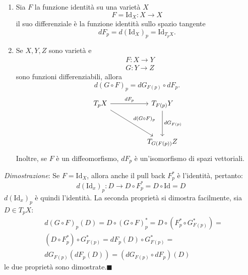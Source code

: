 \documentclass[10pt, letterpaper]{report}
\begin{document}
\begin{proposizione}
    \begin{enumerate}
    \item Sia $F$ la funzione identità su una varietà $X$\begin{equation}
        F=\text{Id}_X:X\rightarrow X
    \end{equation}
    il suo differenziale è la funzione identità sullo spazio tangente\begin{equation}
        dF_p=d(\text{Id}_X)_p=\text{Id}_{T_pX}.
    \end{equation}
    \item Se $X,Y,Z$ sono varietà e \begin{align}
        &F:X\rightarrow Y\\ 
        &G:Y\rightarrow Z
    \end{align}
    sono funzioni differenziabili, allora\begin{equation}
        d(G\circ F)_p=dG_{F(p)}\circ dF_p.
    \end{equation}
\[
\begin{tikzcd}[column sep=huge, row sep=huge]
T_p X \arrow[r, "dF_p"] \arrow[dr, "d(G \circ F)_p"] & T_{F(p)} Y \arrow[d, "dG_{F(p)}"] \\
& T_{G(F(p))} Z
\end{tikzcd}
\]
Inoltre, se $F$ è un diffeomorfismo, $dF_p$ è un'isomorfismo di spazi vettoriali.
\end{enumerate}
\end{proposizione}
\textit{Dimostrazione}:
Se $F=\text{Id}_X$, allora anche il pull back $F_p^*$ è l'identità, pertanto:\begin{equation}
    d(\text{Id}_x)_p:D\rightarrow D\circ F_p^* =D\circ \text{Id}=D
\end{equation}
$d(\text{Id}_x)_p$ è quindi l'identità. La seconda proprietà si dimostra facilmente, sia $D\in T_pX$:\begin{align}
    &d(G\circ F)_p(D)=D\circ (G\circ F)_p^*=D\circ (F_p^*\circ G_{F(p)}^*)=\\ 
    &(D\circ F_p^*)\circ G_{F(p)}^*=dF_p(D)\circ G_{F(p)}^*=\\ 
    &dG_{F(p)}(dF_p(D))=(dG_{F(p)}\circ dF_p)(D)
\end{align}
le due proprietà sono dimostrate.\hfill$\blacksquare$
\end{document}
